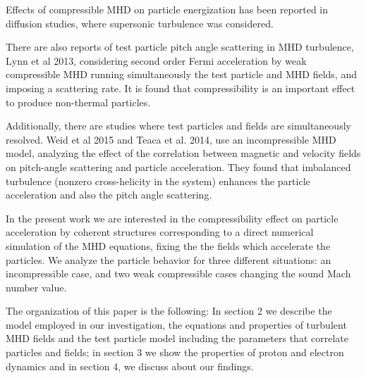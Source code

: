 \documentclass[%
aip,pop,amsmath,amssymb,
 reprint,%
]{revtex4-1}
\begin{document}
Effects of compressible MHD on particle energization has been reported 
in diffusion studies\cite{Chandran2003,CHO1}, where supersonic
turbulence was considered.

There are also reports of test particle pitch angle scattering in 
MHD turbulence, Lynn et al 2013\cite{Lynn2013}, considering 
second order Fermi acceleration by weak compressible MHD running simultaneously
the test particle and MHD fields, and imposing a scattering rate.
It is found that compressibility 
is an important effect to produce non-thermal particles. 

Additionally, there are
studies where test particles and fields are simultaneously resolved.
Weid et al 2015\cite{Weidl2015} and Teaca et al. 2014\cite{Bogdan2014}, 
use an incompressible MHD model, analyzing the effect of the 
correlation between magnetic and velocity fields 
on pitch-angle scattering and particle 
acceleration. They found that imbalanced turbulence (nonzero cross-helicity in 
the system) enhances the particle acceleration and also 
the pitch angle scattering.

In the present work we are interested in the compressibility effect 
on particle 
acceleration by coherent structures corresponding to a direct numerical 
simulation of the MHD equations, fixing the the fields which accelerate
the particles. 
We 
analyze the particle behavior for three different situations: an 
incompressible case, and 
two weak compressible cases changing the sound Mach number value. 

The organization of this paper is the following:  In section 2  
we describe the model 
employed in our investigation, the equations and properties of 
turbulent MHD fields and the 
test particle model including the parameters that correlate 
particles and fields; 
in section 3 we show the properties of proton and electron dynamics 
and in section 4, we
discuss about our findings.
\end{document}
